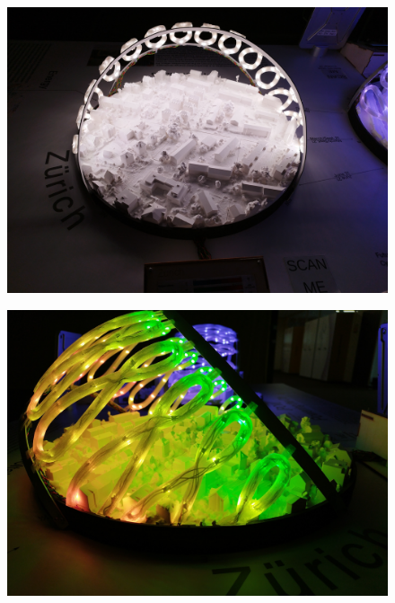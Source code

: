 \documentclass[a4paper,9pt]{article}
\begin{document}
    \hfill
    \begin{minipage}{0.48\linewidth}
         \begin{figure}[H]
        \centering
        \includegraphics[width=\linewidth]{Images/5.jpg}
  
    \end{figure}
\end{minipage}
\begin{minipage}{0.48\linewidth}
         \begin{figure}[H]
        \centering
        \includegraphics[width=\linewidth]{Images/f1.jpg}
    
    \end{figure}
    \end{minipage}
\end{document}
